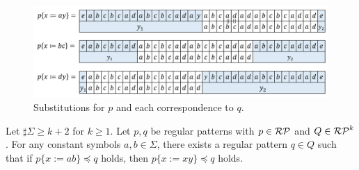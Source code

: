 \begin{figure}[t]
\includegraphics[width=\linewidth]{figs/Exam_b=a_c=d.png}
\caption{Substitutions for $p$ and each correspondence to $q$.}
\label{b=aとc=dの例}
\end{figure}

\begin{lem}\label{追加補題1}
Let $\sharp \Sigma \ge k+2$ for $k\geq 1$. Let $p,q$ be regular patterns with $p \in \mathcal{RP}$ and $Q \in \mathcal{RP}^{k}$.
For any constant symbols $a, b \in \Sigma$, there exists a regular pattern $q \in Q$ such that if $p \{ x:=ab \} \preceq q$ holds, then $p \{ x:=xy \} \preceq q$ holds.
\end{lem}

